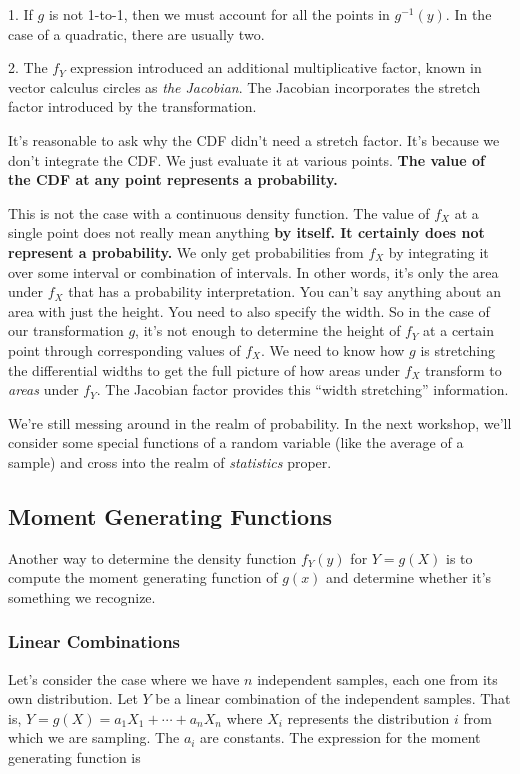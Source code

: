 \documentclass[]{article}
\begin{document}
1. If $g$ is not 1-to-1, then we must account for all the points
   in $g^{-1}(y)$.  In the case of a quadratic, there are usually
   two.

2. The $f_Y$ expression introduced an additional multiplicative
   factor, known in vector calculus circles as \emph{the Jacobian}.
   The Jacobian incorporates the stretch factor introduced by the
   transformation.

It's reasonable to ask why the CDF didn't need a stretch factor.
It's because we don't integrate the CDF.  We just evaluate it at
various points.
\textbf{The value of the CDF at any point represents a probability.}

This is not the case with a continuous density function.  The
value of $f_X$ at a single point does not really mean anything
\textbf{by itself.
It certainly does not represent a probability.}  We only get
probabilities from $f_X$ by integrating it over some interval
or combination of intervals.  In other words, it's only the
area under $f_X$ that has a probability interpretation.  You
can't say anything about an area with just the height.  You
need to also specify the width.  So in the case of our transformation
$g$, it's not enough to determine the height of $f_Y$ at a certain
point through corresponding values of $f_X$.  We need to know how
$g$ is stretching the differential widths to get the full picture
of how areas under $f_X$ transform to \emph{areas} under $f_Y$.  The
Jacobian factor provides this ``width stretching'' information.

We're still messing around in the realm of probability.  In the next
workshop, we'll consider some special functions of a random
variable (like the average of a sample) and cross into the
realm of \emph{statistics} proper.

\subsection{Moment Generating Functions}

Another way to determine the density function $f_Y(y)$ for
$Y = g(X)$ is to compute the moment generating function of
$g(x)$ and determine whether it's something we recognize.

\subsubsection{Linear Combinations}

Let's consider the case where we have $n$ independent samples,
each one from its own distribution.  Let $Y$ be a linear
combination of the independent samples.  That is,
$Y = g(X) = a_1 X_1 + \cdots + a_n X_n$ where $X_i$
represents the distribution $i$ from which we are sampling.
The $a_i$ are constants.
The expression for the moment generating function is
\end{document}
